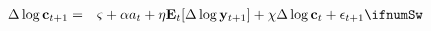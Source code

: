 \begin{eqnarray}
\Delta \log \mathbf{c}_{t+1} & = & \varsigma+{\alpha} a_{t} + \eta \mathbf{E}_{t}[\Delta \log \mathbf{y}_{t+1}] + \chi \Delta \log \mathbf{c}_{t} + \epsilon_{t+1} \label{eq:microEuler} \ifnumSw
\end{eqnarray}
